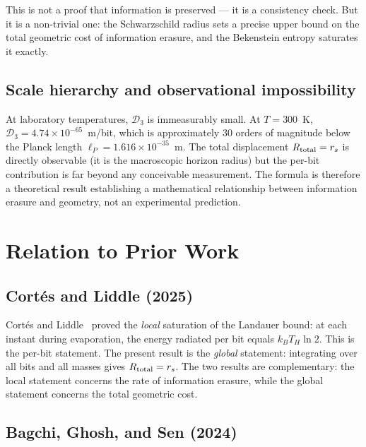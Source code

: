 \documentclass[aps,prd,twocolumn,showpacs,preprintnumbers,amsmath,amssymb,longbibliography]{revtex4-2}
\begin{document}
This is not a proof that information is preserved --- it is a consistency check. 
But it is a non-trivial one: the Schwarzschild radius sets a precise upper bound 
on the total geometric cost of information erasure, and the Bekenstein entropy 
saturates it exactly.

\subsection{Scale hierarchy and observational impossibility}

At laboratory temperatures, $\mathcal{D}_3$ is immeasurably small. At $T = 300$~K, 
$\mathcal{D}_3 = 4.74 \times 10^{-65}$~m/bit, which is approximately $30$ orders 
of magnitude below the Planck length $\ell_P = 1.616 \times 10^{-35}$~m. The total 
displacement $R_{\rm total} = r_s$ is directly observable (it is the macroscopic 
horizon radius) but the per-bit contribution is far beyond any conceivable 
measurement. The formula is therefore a theoretical result establishing a 
mathematical relationship between information erasure and geometry, not an 
experimental prediction.

\section{Relation to Prior Work}
\label{sec:priorwork}

\subsection{Cort\'es and Liddle (2025)}

Cort\'es and Liddle~\cite{cortes2025} proved the \textit{local} saturation of the 
Landauer bound: at each instant during evaporation, the energy radiated per bit 
equals $k_B T_H \ln 2$. This is the per-bit statement. The present result is the 
\textit{global} statement: integrating over all bits and all masses gives 
$R_{\rm total} = r_s$. The two results are complementary: the local statement 
concerns the rate of information erasure, while the global statement concerns the 
total geometric cost.

\subsection{Bagchi, Ghosh, and Sen (2024)}
\end{document}

